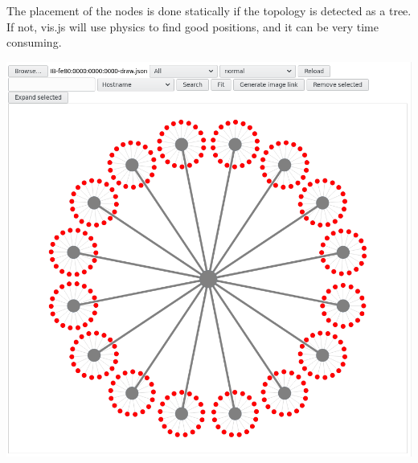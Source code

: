 The placement of the nodes is done statically if the topology is detected as a tree. If not, vis.\+js will use physics to find good positions, and it can be very time consuming.

 
\begin{DoxyImageNoCaption}
  \mbox{\includegraphics[width=15cm]{netloc_draw.png}}
\end{DoxyImageNoCaption}
 